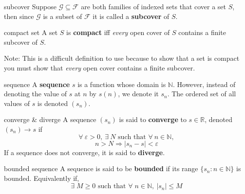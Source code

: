 \documentclass[avery5371,grid]{flashcards}
\newcommand{\N}{\mathbb{N}}
\newcommand{\R}{\mathbb{R}}
\begin{document}
\begin{flashcard}[Definition]{subcover}
Suppose $\mathscr{G} \subseteq \mathscr{F}$ are both families of indexed sets
that cover a set $S$, then since $\mathscr{G}$ is a subset of $\mathscr{F}$
it is called a \mbox{\textbf{subcover}} of $S$.
\end{flashcard}

\begin{flashcard}[Definition]{compact set}
A set $S$ is \mbox{\textbf{compact}} iff \emph{every} open cover
of $S$ contains a finite subcover of $S$.

\bigskip
Note:  This is a difficult definition to use because to show that a
set is compact you must show that \emph{every} open cover contains
a finite subcover.
\end{flashcard}


\begin{flashcard}[Definition]{sequence}
A \mbox{\textbf{sequence}} $s$ is a function whose domain is $\N$.
However, instead of denoting the value of $s$ at $n$ by $s(n)$,
we denote it $s_{n}$.  The ordered set of all values of $s$ is denoted
$(s_{n})$. 
\end{flashcard}

\begin{flashcard}[Definition]{converge \& diverge}
A sequence $(s_{n})$ is said to \mbox{\textbf{converge}} to $s \in \R$,
denoted $(s_{n}) \rightarrow s$ if
\begin{equation*}
\forall \ \varepsilon > 0, \ \exists \ N \textrm{ such that } \forall \ 
n \in \N,
\end{equation*}
\begin{equation*}
n>N \Rightarrow |s_{n} - s| < \varepsilon
\end{equation*}
If a sequence does not converge, it is said to \mbox{\textbf{diverge}}.
\end{flashcard}

\begin{flashcard}[Definition]{bounded sequence}
\vspace*{\stretch{1}}
A sequence is said to be \mbox{\textbf{bounded}} if its range
\mbox{$\{ s_{n} : n \in \N \}$} is bounded.  Equivalently if,
\begin{equation*}
\exists \; M \geq 0 \textrm{ such that }
\forall \; n \in \N, \  |s_{n}| \leq M
\end{equation*}
\end{flashcard}
\end{document}

